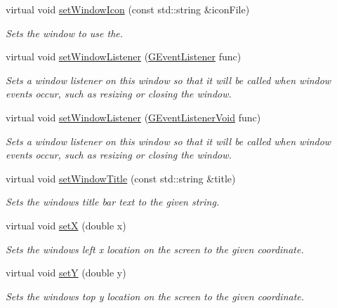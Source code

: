 \begin{DoxyCompactItemize}
virtual void \mbox{\hyperlink{classsgl_1_1GWindow_ab21f6abd314b7ffd3ccf7b6e18ac18cb}{set\+Window\+Icon}} (const std\+::string \&icon\+File)
\begin{DoxyCompactList}\small\item\em Sets the window to use the. \end{DoxyCompactList}\item 
virtual void \mbox{\hyperlink{classsgl_1_1GWindow_adbb687462d07ac5bd49f3861e4356838}{set\+Window\+Listener}} (\mbox{\hyperlink{namespacesgl_ae9f3e9eab70035da1a2b114e21357b25}{G\+Event\+Listener}} func)
\begin{DoxyCompactList}\small\item\em Sets a window listener on this window so that it will be called when window events occur, such as resizing or closing the window. \end{DoxyCompactList}\item 
virtual void \mbox{\hyperlink{classsgl_1_1GWindow_a58b90463b205519917d5f68bdf068815}{set\+Window\+Listener}} (\mbox{\hyperlink{namespacesgl_a54427ce97bb1c2804e4fe2b0a62e8b17}{G\+Event\+Listener\+Void}} func)
\begin{DoxyCompactList}\small\item\em Sets a window listener on this window so that it will be called when window events occur, such as resizing or closing the window. \end{DoxyCompactList}\item 
virtual void \mbox{\hyperlink{classsgl_1_1GWindow_a1c06b2b64d56394d6d77aa5b627910e2}{set\+Window\+Title}} (const std\+::string \&title)
\begin{DoxyCompactList}\small\item\em Sets the window\textquotesingle{}s title bar text to the given string. \end{DoxyCompactList}\item 
virtual void \mbox{\hyperlink{classsgl_1_1GWindow_a9c18fcc579333bf9653d13ad2b372e39}{setX}} (double x)
\begin{DoxyCompactList}\small\item\em Sets the window\textquotesingle{}s left x location on the screen to the given coordinate. \end{DoxyCompactList}\item 
virtual void \mbox{\hyperlink{classsgl_1_1GWindow_a7d57e2a5c35d27feb58fd498a3cf82b9}{setY}} (double y)
\begin{DoxyCompactList}\small\item\em Sets the window\textquotesingle{}s top y location on the screen to the given coordinate. \end{DoxyCompactList}\item 

\end{DoxyCompactItemize}
